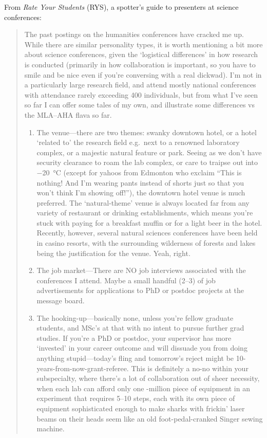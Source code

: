 \documentclass[a4paper]{article}
\begin{document}
\medskip
From {\it Rate Your Students} (RYS), a spotter's guide to presenters at
science conferences:
\begin{quote}
The past postings on the humanities conferences have cracked me up. While
there are similar personality types, it is worth mentioning a bit more
about science conferences, given the `logistical differences' in how
research is conducted (primarily in how collaboration is important,
so you have to smile and be nice even if you're conversing with a
real dickwad). I'm not in a particularly large research field, and
attend mostly national conferences with attendance rarely exceeding 400
individuals, but from what I've seen so far I can offer some tales of
my own, and illustrate some differences vs the MLA--AHA flava so far.

\begin{enumerate}
\item The venue---there are two themes: swanky downtown hotel, or a hotel
`related to' the research field e.g.\ next to a renowned laboratory
complex, or a majestic natural feature or park. Seeing as we don't
have security clearance to roam the lab complex, or care to traipse
out into \SI{-20}{\celsius} (except for yahoos from Edmonton who exclaim ``This is
nothing! And I'm wearing pants instead of shorts just so that you won't
think I'm showing off!''), the downtown hotel venue is much preferred. The
`natural-theme' venue is always located far from any variety of restaurant
or drinking establishments, which means you're stuck with paying
for a breakfast muffin or  for a light beer in the hotel.
Recently,
however, several natural sciences conferences have been held in casino
resorts, with the surrounding wilderness of forests and lakes being the
justification for the venue. Yeah, right.

\item The job market---There are NO job interviews associated with the
conferences I attend. Maybe a small handful (2--3) of job advertisements
for applications to PhD or postdoc projects at the message board.

\item The hooking-up---basically none, unless you're fellow graduate
students, and MSc's at that with no intent to pursue further
grad studies. If you're a PhD or postdoc, your supervisor has
more `invested' in your career outcome and will dissuade you from
doing anything stupid---today's fling and tomorrow's reject might be
10-years-from-now-grant-referee. This is definitely a no-no within your
subspecialty, where there's a lot of collaboration out of sheer necessity,
when each lab can afford only one -million piece of equipment in an
experiment that requires 5--10 steps, each with its own piece of equipment
sophisticated enough to make sharks with frickin' laser beams on their
heads seem like an old foot-pedal-cranked Singer sewing machine.


\end{enumerate}
\end{quote}
\end{document}
